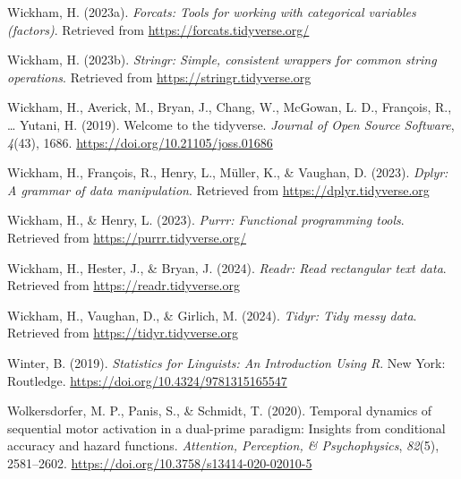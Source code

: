 \documentclass[
  man, donotrepeattitle,floatsintext]{apa6}
\newlength{\cslhangindent}
\newenvironment{CSLReferences}[2] %
 {\begin{list}{}{%
  \setlength{\itemindent}{0pt}
  \setlength{\leftmargin}{0pt}
  \setlength{\parsep}{0pt}
  \ifodd #1
   \setlength{\leftmargin}{\cslhangindent}
   \setlength{\itemindent}{-1\cslhangindent}
  \fi
  \setlength{\itemsep}{#2\baselineskip}}}
 {\end{list}}
\begin{document}
\begin{CSLReferences}{1}{0}
Wickham, H. (2023a). \emph{Forcats: Tools for working with categorical variables (factors)}. Retrieved from \url{https://forcats.tidyverse.org/}

Wickham, H. (2023b). \emph{Stringr: Simple, consistent wrappers for common string operations}. Retrieved from \url{https://stringr.tidyverse.org}

Wickham, H., Averick, M., Bryan, J., Chang, W., McGowan, L. D., François, R., \ldots{} Yutani, H. (2019). Welcome to the {tidyverse}. \emph{Journal of Open Source Software}, \emph{4}(43), 1686. \url{https://doi.org/10.21105/joss.01686}

Wickham, H., François, R., Henry, L., Müller, K., \& Vaughan, D. (2023). \emph{Dplyr: A grammar of data manipulation}. Retrieved from \url{https://dplyr.tidyverse.org}

Wickham, H., \& Henry, L. (2023). \emph{Purrr: Functional programming tools}. Retrieved from \url{https://purrr.tidyverse.org/}

Wickham, H., Hester, J., \& Bryan, J. (2024). \emph{Readr: Read rectangular text data}. Retrieved from \url{https://readr.tidyverse.org}

Wickham, H., Vaughan, D., \& Girlich, M. (2024). \emph{Tidyr: Tidy messy data}. Retrieved from \url{https://tidyr.tidyverse.org}

Winter, B. (2019). \emph{Statistics for {Linguists}: {An Introduction Using R}}. New York: Routledge. \url{https://doi.org/10.4324/9781315165547}

Wolkersdorfer, M. P., Panis, S., \& Schmidt, T. (2020). Temporal dynamics of sequential motor activation in a dual-prime paradigm: {Insights} from conditional accuracy and hazard functions. \emph{Attention, Perception, \& Psychophysics}, \emph{82}(5), 2581--2602. \url{https://doi.org/10.3758/s13414-020-02010-5}

\end{CSLReferences}
\end{document}
